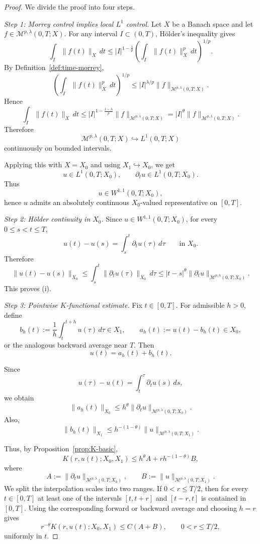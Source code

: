 \documentclass[smallextended,envcountsect,envcountsame]{svjour3}
\begin{document}
	\begin{proof}
		We divide the proof into four steps.
		
		\medskip
		\noindent
		\textit{Step 1: Morrey control implies local $L^1$ control.}
		Let $X$ be a Banach space and let $f\in \mathcal M^{p,\lambda}(0,T;X)$. For any interval $I\subset(0,T)$, Hölder's inequality gives
		\[
		\int_I \|f(t)\|_X\,dt
		\le
		|I|^{1-\frac1p}
		\left(\int_I \|f(t)\|_X^p\,dt\right)^{1/p}.
		\]
		By Definition~\ref{def:time-morrey},
		\[
		\left(\int_I \|f(t)\|_X^p\,dt\right)^{1/p}
		\le
		|I|^{\lambda/p}\|f\|_{\mathcal M^{p,\lambda}(0,T;X)}.
		\]
		Hence
		\[
		\int_I \|f(t)\|_X\,dt
		\le
		|I|^{1-\frac{1-\lambda}{p}}
		\|f\|_{\mathcal M^{p,\lambda}(0,T;X)}
		=
		|I|^\theta
		\|f\|_{\mathcal M^{p,\lambda}(0,T;X)}.
		\]
		Therefore
		\[
		\mathcal M^{p,\lambda}(0,T;X)\hookrightarrow L^1(0,T;X)
		\]
		continuously on bounded intervals.
		
		Applying this with $X=X_0$ and using $X_1\hookrightarrow X_0$, we get
		\[
		u\in L^1(0,T;X_0),
		\qquad
		\partial_t u\in L^1(0,T;X_0).
		\]
		Thus
		\[
		u\in W^{1,1}(0,T;X_0),
		\]
		hence $u$ admits an absolutely continuous $X_0$-valued representative on $[0,T]$.
		
		\medskip
		\noindent
		\textit{Step 2: Hölder continuity in $X_0$.}
		Since $u\in W^{1,1}(0,T;X_0)$, for every $0\le s<t\le T$,
		\[
		u(t)-u(s)=\int_s^t \partial_t u(\tau)\,d\tau
		\qquad\text{in }X_0.
		\]
		Therefore
		\[
		\|u(t)-u(s)\|_{X_0}
		\le
		\int_s^t \|\partial_t u(\tau)\|_{X_0}\,d\tau
		\le
		|t-s|^\theta
		\|\partial_t u\|_{\mathcal M^{p,\lambda}(0,T;X_0)}.
		\]
		This proves \textup{(i)}.
		
		\medskip
		\noindent
		\textit{Step 3: Pointwise $K$-functional estimate.}
		Fix $t\in[0,T]$. For admissible $h>0$, define
		\[
		b_h(t):=\frac1h\int_t^{t+h}u(\tau)\,d\tau\in X_1,
		\qquad
		a_h(t):=u(t)-b_h(t)\in X_0,
		\]
		or the analogous backward average near $T$. Then
		\[
		u(t)=a_h(t)+b_h(t).
		\]
		
		Since
		\[
		u(\tau)-u(t)=\int_t^\tau \partial_t u(s)\,ds,
		\]
		we obtain
		\[
		\|a_h(t)\|_{X_0}
		\le
		h^\theta
		\|\partial_t u\|_{\mathcal M^{p,\lambda}(0,T;X_0)}.
		\]
		Also,
		\[
		\|b_h(t)\|_{X_1}
		\le
		h^{-(1-\theta)}
		\|u\|_{\mathcal M^{p,\lambda}(0,T;X_1)}.
		\]
		
		Thus, by Proposition~\ref{prop:K-basic},
		\[
		K(r,u(t);X_0,X_1)
		\le
		h^\theta A + r h^{-(1-\theta)} B,
		\]
		where
		\[
		A:=\|\partial_t u\|_{\mathcal M^{p,\lambda}(0,T;X_0)},
		\qquad
		B:=\|u\|_{\mathcal M^{p,\lambda}(0,T;X_1)}.
		\]
		We split the interpolation scales into two ranges.  If $0<r\le T/2$, then for every $t\in[0,T]$ at least one of the intervals $[t,t+r]$ and $[t-r,t]$ is contained in $[0,T]$.  Using the corresponding forward or backward average and choosing $h=r$ gives
		\[
		r^{-\theta}K(r,u(t);X_0,X_1)
		\le C(A+B),
		\qquad 0<r\le T/2,
		\]
		uniformly in $t$.


\end{proof}
\end{document}
